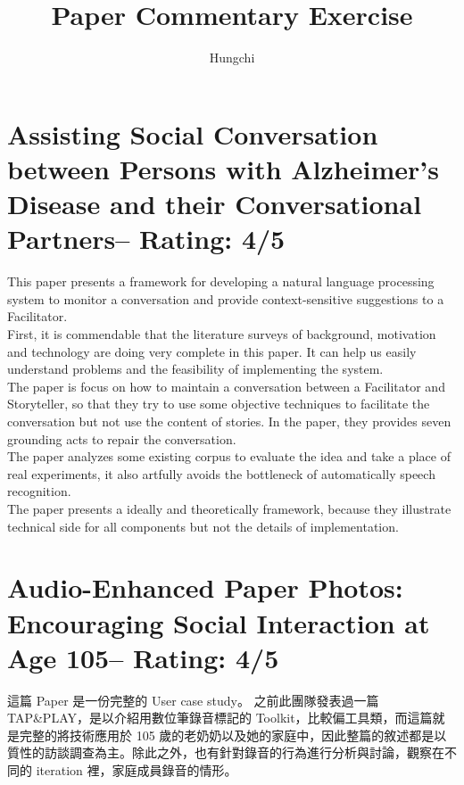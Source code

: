 \documentclass[a4paper]{article}
\title{Paper Commentary Exercise}
\author{Hungchi}
\begin{document}
\maketitle
\section{Assisting Social Conversation between Persons with Alzheimer’s Disease and their Conversational Partners-- Rating: 4/5}
This paper presents a framework for developing a natural language processing system to monitor a conversation and provide context-sensitive suggestions to a Facilitator.\\
First, it is commendable that the literature surveys of background, motivation and technology are doing very complete in this paper. It can help us easily understand problems and the feasibility of implementing the system.\\

The paper is focus on how to maintain a conversation between a Facilitator and Storyteller, so that they try to use some objective techniques to facilitate the conversation but not use the content of stories. In the paper, they provides seven grounding acts to repair the conversation.\\


The paper analyzes some existing corpus to evaluate the idea and take a place of real experiments, it also artfully avoids the bottleneck of automatically speech recognition. \\

The paper presents a ideally and theoretically framework, because they illustrate technical side for all components but not the details of implementation. \\



\section{Audio-Enhanced Paper Photos: Encouraging Social Interaction at Age 105-- Rating: 4/5}

這篇 Paper 是一份完整的 User case study。 之前此團隊發表過一篇 TAP\&PLAY，是以介紹用數位筆錄音標記的 Toolkit，比較偏工具類，而這篇就是完整的將技術應用於 105 歲的老奶奶以及她的家庭中，因此整篇的敘述都是以質性的訪談調查為主。除此之外，也有針對錄音的行為進行分析與討論，觀察在不同的 iteration 裡，家庭成員錄音的情形。\\
\end{document}
